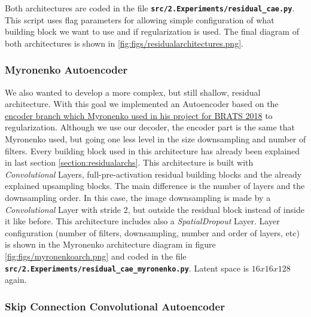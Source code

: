 

Both architectures are coded in the file \textbf{ \texttt{src/2.Experiments\-/residual\_cae.py}}. This script uses flag parameters for allowing simple configuration of what building block we want to use and if regularization is used. The final diagram of both architectures is shown in \ref{fig:figs/residualarchitectures.png}.



\subsubsection{Myronenko Autoencoder}

We also wanted to develop a more complex, but still shallow, residual architecture. With this goal we implemented an Autoencoder based on the \href{https://github.com/IAmSuyogJadhav/3d-mri-brain-tumor-segmentation-using-autoencoder-regularization}{encoder branch which Myronenko used in his project for BRATS 2018} \cite{myronenko20183d} to regularization. Although we use our decoder, the encoder part is the same that Myronenko used, but going one less level in the size downsampling and number of filters. Every building block used in this architecture has already been explained in last section \ref{section:residualarchs}. This architecture is built with \textit{Convolutional} Layers, full-pre-activation residual building blocks and the already explained upsampling blocks. The main difference is the number of layers and the downsampling order. In this case, the image downsampling is made by a \textit{Convolutional} Layer with stride 2, but outside the residual block instead of inside it like before. This architecture includes also a \textit{SpatialDropout} Layer. Layer configuration (number of filters, downsampling, number and order of layers, etc) is shown in the Myronenko architecture diagram in figure \ref{fig:figs/myronenkoarch.png} and coded in the file \textbf{\texttt{src/2.Experiments\-/residual\-\_cae\-\_myronenko.py}}. Latent space is $16x16x128$ again.


\subsubsection{Skip Connection Convolutional Autoencoder}

